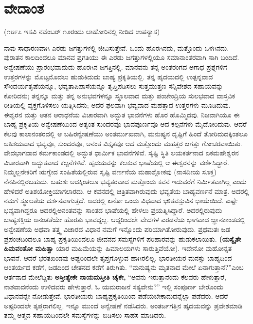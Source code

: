 
\chapter{ವೇದಾಂತ}

\begin{center}
(೧೮೯೭ ಇಸವಿ ನವೆಂಬರ್​ ೧೨ರಂದು ಲಾಹೋರಿನಲ್ಲಿ ನೀಡಿದ ಉಪನ್ಯಾಸ)
\end{center}

ನಾವು ಸಾಧಾರಣವಾಗಿ ಎರಡು ಜಗತ್ತುಗಳಲ್ಲಿ ಜೀವಿಸುತ್ತೇವೆ. ಒಂದು ಹೊರಗಿನದು, ಮತ್ತೊಂದು ಒಳಗಿನದು. ಪುರಾತನ ಕಾಲದಿಂದಲೂ ಮಾನವ ಪ್ರಗತಿಯು ಈ ಎರಡು ಜಗತ್ತುಗಳಲ್ಲಿಯೂ ಸಮಾನಾಂತರವಾಗಿ ಸಾಗಿ ಬಂದಿದೆ. ಅನ್ವೇಷಣೆಯು ಪ್ರಾರಂಭವಾದುದು ಹೊರಗಿನ ಜಗತ್ತಿನಲ್ಲಿ. ಮಾನವನು ತನ್ನ ಅಂತರಂಗದ ಅಗಾಧ ಪ್ರಶ್ನೆಗಳಿಗೆ ಉತ್ತರಗಳನ್ನು ಮೊಟ್ಟಮೊದಲು ಹುಡುಕಿದುದು ಬಾಹ್ಯ ಪ್ರಕೃತಿಯಲ್ಲಿ. ತನ್ನ ಹೃದಯದಲ್ಲಿ ಉತ್ಪನ್ನವಾದ ಸೌಂದರ್ಯತೃಷೆಯನ್ನೂ, ಭವ್ಯತಾಪಿಪಾಸೆಯನ್ನೂ ತೃಪ್ತಿಪಡಿಸಲು ಸುತ್ತಮುತ್ತಣ ಸನ್ನಿವೇಶದ ಸಹಾಯವನ್ನು ಕೋರಿದನು; ತನ್ನನ್ನೂ ಮತ್ತು ತನ್ನ ಅನುಭವಗಳನ್ನೂ ಸ್ಥೂಲವಾದ ಮತ್ತು ಪಂಚೇಂದ್ರಿಯ ಸುಲಭವಾದ ವಾಸ್ತವಿಕ ರೀತಿಯಲ್ಲಿ ವ್ಯಕ್ತಗೊಳಿಸಲು ಯತ್ನಿಸಿದನು; ಅದರ ಫಲವಾಗಿ ಭವ್ಯವಾದ ಮಹತ್ತಾದ ಉತ್ತರಗಳು ಮೂಡಿದುವು. ಈಶ್ವರನ ಮತ್ತು ಆತನ ಆರಾಧನೆಯ ವಿಚಾರವಾಗಿ ಅದ್ಭುತ ಭಾವನೆಗಳು ಹೊರ ಹೊಮ್ಮಿದವು. ನಿಜವಾಗಿಯೂ ಈ ಬಾಹ್ಯ ಪ್ರಕೃತಿಯ ಅನ್ವೇಷಣೆಯಿಂದ ಅತ್ಯಂತ ಸುಂದರವೂ ಭಾವಪೂರ್ಣವೂ ಆದ ಕಲ್ಪನೆಗಳು ಮೈದೋರಿದುವು. ಆದರೆ ಕೆಲವು ಕಾಲಾನಂತರದಲ್ಲಿ ಆ ಬಹಿರನ್ವೇಷಣೆಯು ಅಂತರ್ಮುಖವಾಗಿ, ಮನುಷ್ಯನ ದೃಷ್ಟಿಗೆ ಹಿಂದೆ ತೋರಿದುದಕ್ಕಿಂತಲೂ ಅತಿಶಯವಾದ ಭವ್ಯವೂ, ಸುಂದರವೂ, ಅನಂತ ವಿಸ್ತೃತವೂ ಆದ ಮತ್ತೊಂದು ಮಹತ್ತರ ಜಗತ್ತು ಗೋಚರವಾಯಿತು. ವೇದಭಾಗವಾದ ಕರ್ಮಕಾಂಡದಲ್ಲಿ ಅದ್ಭುತ ಧಾರ್ಮಿಕ ಭಾವನೆಗಳಿವೆ. ಸೃಷ್ಟಿ ಸ್ಥಿತಿ ಲಯಕರ್ತನಾದ ಏಕಮಹೇಶ್ವರನ ವಿಚಾರವಾಗಿ ಅದ್ಭುತವಾದ ಕಲ್ಪನೆಗಳಿವೆ. ಹೃದಯವನ್ನು ಕಲಕುವ ಭಾಷೆಯಲ್ಲಿ ಆ ಈಶ್ವರನನ್ನು ವರ್ಣಿಸಿದ್ದಾರೆ. ನಿಮ್ಮಲ್ಲನೇಕರಿಗೆ ಋಗ್ವೇದ ಸಂಹಿತೆಯಲ್ಲಿರುವ ಸೃಷ್ಟಿ ವರ್ಣನೆಯ ಮಹಾಶ್ಲೋಕವು (ನಾಸದೀಯ ಸೂಕ್ತ) ನೆನಪಿನಲ್ಲಿರಬಹುದು. ಬಹುಶಃ ಅದಕ್ಕಿಂತಲೂ ಭವ್ಯತರವಾದ ಮತ್ತೊಂದು ಕವನ ಇದುವರೆಗೆ ನಿರ್ಮಿತವಾಗಿಲ್ಲ ಎಂದು ಹೇಳಿದರೆ ಅತಿಶಯೋಕ್ತಿಯಾಗಲಾರದು. ಆ ಕವನದಲ್ಲಿ ಚಿತ್ರಿತವಾಗಿರುವುದು ಭವ್ಯತೆಯ ಬಾಹ್ಯವರ್ಣನೆ ಮಾತ್ರ. ಅದರಲ್ಲಿ ನಮಗೆ ಸ್ಥೂಲತೆಯ ದರ್ಶನವಾಗುತ್ತದೆ. ಅದರಲ್ಲಿ ಏನೋ ಒಂದು ವಿಧವಾದ ಭೌತವಸ್ತುವಿನ ಛಾಯೆಯಿದೆ. ಎಷ್ಟೇ ಭವ್ಯವಾಗಿದ್ದರೂ ಅದರಲ್ಲಿ\break ಅನಂತವನ್ನು ಸಾಂತದ ಭಾಷೆಯಲ್ಲಿ ಹೇಳಲು ಪ್ರಯತ್ನಿಸಿದ್ದಾರೆ. ಅದರಲ್ಲಿರುವುದು ಬಾಹ್ಯಶಕ್ತಿಯ ಅನಂತತೆಯೇ ಹೊರತು ಭಾವದ್ದಲ್ಲ. ಆದ್ದರಿಂದಲೇ ವೇದಗಳ ಎರಡನೆಯ ಭಾಗವಾದ ಜ್ಞಾನಕಾಂಡದಲ್ಲಿ ಅನ್ವೇಷಣೆಯ ಅಥವಾ ತತ್ತ್ವ ವಿಚಾರದ ವಿಧಾನ ನಮಗೆ ಇನ್ನೊಂದು ಪರಿಯಾಗಿತೋರುವುದು. ಪ್ರಥಮತಃ ಜಡ ಪ್ರಪಂಚದಿಂದಲೂ ಬಾಹ್ಯ ಪ್ರಕೃತಿಯಿಂದಲೂ ಜೀವನದ ಸಮಸ್ಯೆಗಳಿಗೆ ಪರಿಹಾರವನ್ನು ಹುಡುಕಲಾಯಿತು. \textbf{(ಯಸ್ಯೈತೇ ಹಿಮವಂತೋ ಮಹಿತ್ವಾ } ಯಾರ ಮಹಿಮೆಯನ್ನು ಹಿಮಾಲಯಗಳು ಸಾರುತ್ತಿವೆಯೋ). ಇದೇನೋ ಮಹೋನ್ನತ ಭಾವನೆ. ಆದರೆ ಭರತಖಂಡವು ಅಷ್ಟರಿಂದಲೇ ತೃಪ್ತಗೊಳ್ಳುವ ಹಾಗಿರಲಿಲ್ಲ. ಭಾರತೀಯರ ಮನಸ್ಸು ಬಾಹ್ಯದಿಂದ ಆಂತರ್ಯದ ಕಡೆಗೆ, ಜಡದಿಂದ ಚೇತನದ ಕಡೆಗೆ ತಿರುಗಿತು. “ಮನುಷ್ಯನು ಮೃತನಾದ ಮೇಲೆ ಏನಾಗುತ್ತಾನೆ?”ಎಂಬ ಆರ್ತನಾದ ಮೇಲೆದ್ದಿತು \textbf{ಅಸ್ತೀತ್ಯೇಕೇ ನಾಯಮಸ್ತೀತಿ ಚೈಕೇ, } “ಅವನು ಇರುತ್ತಾನೆಂದು ಕೆಲವರು ಹೇಳುತ್ತಾರೆ, ನಾಶವಾದನೆಂದು ಉಳಿದವರು ಹೇಳುತ್ತಾರೆ. ಓ ಯಮರಾಜನೆ ಸತ್ಯವೇನು?” ಇಲ್ಲಿ ಸಂಪೂರ್ಣ ಬೇರೊಂದು ವಿಧಾನವನ್ನೇ ನೋಡುತ್ತೇವೆ. ಭಾರತೀಯರು ಬಾಹ್ಯಪ್ರಕೃತಿಯಿಂದ ಪಡೆಯಬೇಕಾದುದನ್ನೆಲ್ಲಾ ಪಡೆದರು. ಆದರೆ ಅಷ್ಟರಿಂದಲೇ ತೃಪ್ತರಾಗಲಿಲ್ಲ. ಇನ್ನೂ ಮುಂದೆ ಅನ್ವೇಷಣೆ ನಡೆಸಿದರು. ಅಂತರ್ಜಗತ್ತಿನ ಹೃದಯವನ್ನು ಪ್ರವೇಶಮಾಡಿ ತಮ್ಮ ಆತ್ಮದ ಸಹಾಯದಿಂದಲೇ ಸಮಸ್ಯೆಗಳನ್ನು ಬಿಡಿಸಲು ಸಾಹಸ ಮಾಡಿದರು. 

